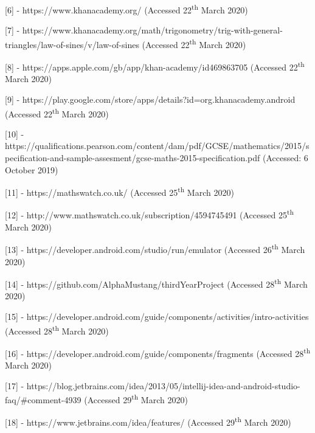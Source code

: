 \documentclass{article}
\begin{document}
[6] - https://www.khanacademy.org/ (Accessed 22\textsuperscript{th} March 2020) \par

[7] - https://www.khanacademy.org/math/trigonometry/trig-with-general-triangles/law-of-sines/v/law-of-sines (Accessed 22\textsuperscript{th} March 2020) \par

[8] - https://apps.apple.com/gb/app/khan-academy/id469863705 (Accessed 22\textsuperscript{th} March 2020) \par

[9] - https://play.google.com/store/apps/details?id=org.khanacademy.android (Accessed 22\textsuperscript{th} March 2020) \par

[10] - https://qualifications.pearson.com/content/dam/pdf/GCSE/mathematics/2015/specification-and-sample-assesment/gcse-maths-2015-specification.pdf (Accessed: 6 October 2019) \par

[11] - https://mathswatch.co.uk/ (Accessed 25\textsuperscript{th} March 2020) \par

[12] - http://www.mathswatch.co.uk/subscription/4594745491 (Accessed 25\textsuperscript{th} March 2020) \par

[13] - https://developer.android.com/studio/run/emulator (Accessed 26\textsuperscript{th} March 2020) \par

[14] - https://github.com/AlphaMustang/thirdYearProject (Accessed 28\textsuperscript{th} March 2020) \par

[15] - https://developer.android.com/guide/components/activities/intro-activities (Accessed 28\textsuperscript{th} March 2020) \par

[16] - https://developer.android.com/guide/components/fragments (Accessed 28\textsuperscript{th} March 2020) \par

[17] - https://blog.jetbrains.com/idea/2013/05/intellij-idea-and-android-studio-faq/\#comment-4939 (Accessed 29\textsuperscript{th} March 2020) \par

[18] - https://www.jetbrains.com/idea/features/ (Accessed 29\textsuperscript{th} March 2020) \par
\end{document}
